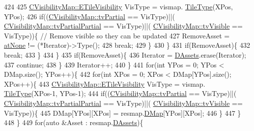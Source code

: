 \begin{DoxyCode}
424 
425                 \hyperlink{classCVisibilityMap_a6665f905da08825adbb0eee7bd1f2f30}{CVisibilityMap::ETileVisibility} VisType = vismap.
      \hyperlink{classCVisibilityMap_a8517fe52114dd469093fd1bd13482733}{TileType}(XPos, YPos);
426                 \textcolor{keywordflow}{if}((\hyperlink{classCVisibilityMap_a6665f905da08825adbb0eee7bd1f2f30a0037f47075e3bde5e8e32dbd55754976}{CVisibilityMap::tvPartial} == VisType)||(
      \hyperlink{classCVisibilityMap_a6665f905da08825adbb0eee7bd1f2f30a75af969b6d667b802b64bacd8bca7b63}{CVisibilityMap::tvPartialPartial} == VisType)||(
      \hyperlink{classCVisibilityMap_a6665f905da08825adbb0eee7bd1f2f30a3c881652ef7164aa086e595eef0ff5d6}{CVisibilityMap::tvVisible} == VisType))\{ \textcolor{comment}{// Remove visible so they can be updated}
427                     RemoveAsset = \hyperlink{GameDataTypes_8h_a5600d4fc433b83300308921974477feca82fb51718e2c00981a2d37bc6fe92593}{atNone} != (*Iterator)->Type();
428                     \textcolor{keywordflow}{break};
429                 \}
430             \}
431             \textcolor{keywordflow}{if}(RemoveAsset)\{
432                 \textcolor{keywordflow}{break};   
433             \}
434         \}
435         \textcolor{keywordflow}{if}(RemoveAsset)\{
436             Iterator = \hyperlink{classCAssetDecoratedMap_a94eeed5b16141169b1ba6cb3842055aa}{DAssets}.erase(Iterator);
437             \textcolor{keywordflow}{continue};
438         \}
439         Iterator++;
440     \}
441     \textcolor{keywordflow}{for}(\textcolor{keywordtype}{int} YPos = 0; YPos < DMap.size(); YPos++)\{
442         \textcolor{keywordflow}{for}(\textcolor{keywordtype}{int} XPos = 0; XPos < DMap[YPos].size(); XPos++)\{
443             \hyperlink{classCVisibilityMap_a6665f905da08825adbb0eee7bd1f2f30}{CVisibilityMap::ETileVisibility} VisType = vismap.
      \hyperlink{classCVisibilityMap_a8517fe52114dd469093fd1bd13482733}{TileType}(XPos-1, YPos-1);
444             \textcolor{keywordflow}{if}((\hyperlink{classCVisibilityMap_a6665f905da08825adbb0eee7bd1f2f30a0037f47075e3bde5e8e32dbd55754976}{CVisibilityMap::tvPartial} == VisType)||(
      \hyperlink{classCVisibilityMap_a6665f905da08825adbb0eee7bd1f2f30a75af969b6d667b802b64bacd8bca7b63}{CVisibilityMap::tvPartialPartial} == VisType)||(
      \hyperlink{classCVisibilityMap_a6665f905da08825adbb0eee7bd1f2f30a3c881652ef7164aa086e595eef0ff5d6}{CVisibilityMap::tvVisible} == VisType))\{
445                 DMap[YPos][XPos] = resmap.\hyperlink{classCTerrainMap_a80d154ce478948b10473534a7bca13f6}{DMap}[YPos][XPos];
446             \}
447         \}
448     \}
449     \textcolor{keywordflow}{for}(\textcolor{keyword}{auto} &Asset : resmap.\hyperlink{classCAssetDecoratedMap_a94eeed5b16141169b1ba6cb3842055aa}{DAssets})\{

\end{DoxyCode}
